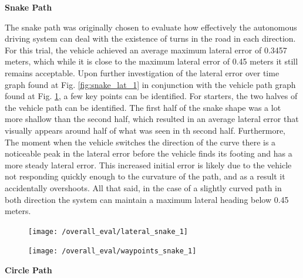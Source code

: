 \documentclass[titlepage,draft]{article}
\begin{document}
{\textbf{Snake Path}

The snake path was originally chosen to evaluate how effectively the autonomous driving system can deal with the existence of turns in the road in each direction. For this trial, the vehicle achieved an average maximum lateral error of 0.3457 meters, which while it is close to the maximum lateral error of 0.45 meters it still remains acceptable. Upon further investigation of the lateral error over time graph found at Fig. \ref{fig:snake_lat_1} in conjunction with the vehicle path graph found at Fig. \ref{fig:snake_way_1}, a few key points can be identified. For starters, the two halves of the vehicle path can be identified. The first half of the snake shape was a lot more shallow than the second half, which resulted in an average lateral error that visually appears around half of what was seen in th second half. Furthermore, The moment when the vehicle switches the direction of the curve there is a noticeable peak in the lateral error before the vehicle finds its footing and has a more steady lateral error. This increased initial error is likely due to the vehicle not responding quickly enough to the curvature of the path, and as a result it accidentally overshoots. All that said, in the case of a slightly curved path in both direction the system can maintain a maximum lateral heading below 0.45 meters.

\begin{figure}
	\centering
	\begin{minipage}{.45\textwidth}
		\centering
		\texttt{[image: /overall\_eval/lateral\_snake\_1]}
		\label{fig:snake_lat_1}
	\end{minipage}%
	\hspace{0.1\textwidth}%
	\begin{minipage}{.45\textwidth}
		\centering
		\texttt{[image: /overall\_eval/waypoints\_snake\_1]}
		\label{fig:snake_way_1}
	\end{minipage}
\end{figure}

\textbf{Circle Path}

}
\end{document}
